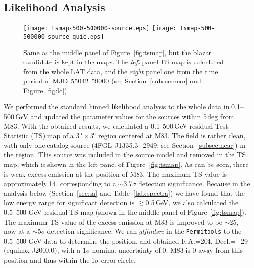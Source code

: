 \documentclass[twocolumn]{aastex631}
\begin{document}
\subsection{Likelihood Analysis}
\label{sec:mla}

\begin{figure*}
	\centering
   \texttt{[image: tsmap-500-500000-source.eps]}
   \texttt{[image: tsmap-500-500000-source-quie.eps]}
	\caption{Same as the middle panel of Figure~\ref{fig:tsmap}, but
	the blazar candidate is kept in the maps. The {\it left} panel TS map is
	calculated from the whole LAT data, and the {\it right} panel one 
	from the time period of MJD~55042--59000
	(see Section~\ref{subsec:near} and Figure~\ref{fig:lc}).  }
   \label{fig:tsmap-quie}
\end{figure*}

We performed the standard binned likelihood analysis to the whole data in
0.1--500\,GeV and 
updated the parameter values for the sources within 5\,deg from M83. 
With the obtained results, we calculated a 0.1--500\,GeV residual 
Test Statistic (TS) map of a $\mathrm{3^{o}\times3^{o}}$ region centered at 
M83. The field is rather clean, with only one catalog source
(4FGL~J1335.3$-$2949; see Section~\ref{subsec:near}) in the region.
This source was included in the source model and removed in the TS map, 
which is shown in the left panel of Figure~\ref{fig:tsmap}. As can be seen, 
there is 
weak excess emission at the position of M83. The maximum TS value is 
approximately 14, corresponding to a $\sim$3.7$\sigma$ detection significance. 
Because in the analysis below (Section~\ref{sec:sa} and 
Table~\ref{tab:spectra}) we have found that the low energy range 
for significant detection is $\gtrsim$0.5\,GeV, 
we also calculated the 0.5--500 GeV residual TS map (shown in
the middle panel of Figure~\ref{fig:tsmap}).  The maximum TS value of  
the excess emission at M83 is improved to be $\sim$25, now at a 
$\sim$5$\sigma$ detection significance. We ran \textit{gtfindsrc} in 
the {\tt Fermitools} to the 0.5--500 GeV data to determine the position,
and obtained R.A.=204, Decl.=$-$29 (equinox J2000.0), with 
a 1$\sigma$ nominal uncertainty of 0. M83 is 0 away from 
this position and thus within the 1$\sigma$ error circle.
\end{document}
